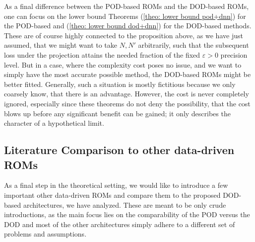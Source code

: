As a final difference between the POD-based ROMs and the DOD-based ROMs, one can focus on the lower bound
Theorems (\ref{theo: lower bound pod+dnn}) for the POD-based and (\ref{theo: lower bound dod+dnn}) for
the DOD-based methods. These are of course highly connected to the proposition above, as we have just assumed, 
that we might want to take $N, N'$ arbitrarily, such that the subsequent loss under the projection attains
the needed fraction of the fixed $\varepsilon > 0$ precision level. But in a case, where the complexity
cost poses no issue, and we want to simply have the most accurate possible method, the DOD-based ROMs
might be better fitted. Generally, such a situation is mostly fictitious because we only coarsely know, that
there is an advantage. However, the cost is never completely ignored, especially since these theorems do not
deny the possibility, that the cost blows up before any significant benefit can be gained; it only
describes the character of a hypothetical limit. 




\subsection{Literature Comparison to other data-driven ROMs}




As a final step in the theoretical setting, we would like to introduce a few important other 
data-driven ROMs and compare them to the proposed DOD-based architectures, we have analyzed.
These are meant to be only crude introductions, as the main focus lies on the comparability of
the POD versus the DOD and most of the other architectures simply adhere to a different set
of problems and assumptions. 

